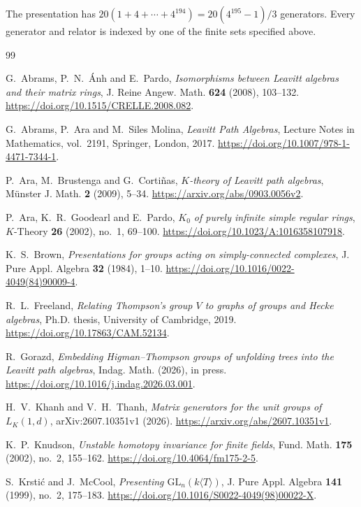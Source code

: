 \documentclass[11pt]{amsart}
\theoremstyle{definition}
\theoremstyle{remark}
\numberwithin{equation}{section}
\begin{document}
The presentation has $20(1+4+\cdots+4^{194})=20(4^{195}-1)/3$ generators. Every generator and relator is indexed by one of the finite sets specified above.

\clearpage
\begin{thebibliography}{99}

G.~Abrams, P.~N.~\'{A}nh and E.~Pardo, \emph{Isomorphisms between Leavitt algebras and their matrix rings}, J. Reine Angew. Math. \textbf{624} (2008), 103--132. \url{https://doi.org/10.1515/CRELLE.2008.082}.

G.~Abrams, P.~Ara and M.~Siles Molina, \emph{Leavitt Path Algebras}, Lecture Notes in Mathematics, vol.~2191, Springer, London, 2017. \url{https://doi.org/10.1007/978-1-4471-7344-1}.

P.~Ara, M.~Brustenga and G.~Corti\~nas, \emph{$K$-theory of Leavitt path algebras}, M\"unster J. Math. \textbf{2} (2009), 5--34. \url{https://arxiv.org/abs/0903.0056v2}.

P.~Ara, K.~R.~Goodearl and E.~Pardo, \emph{$K_0$ of purely infinite simple regular rings}, $K$-Theory \textbf{26} (2002), no.~1, 69--100. \url{https://doi.org/10.1023/A:1016358107918}.

K.~S.~Brown, \emph{Presentations for groups acting on simply-connected complexes}, J. Pure Appl. Algebra \textbf{32} (1984), 1--10. \url{https://doi.org/10.1016/0022-4049(84)90009-4}.

R.~L.~Freeland, \emph{Relating Thompson's group $V$ to graphs of groups and Hecke algebras}, Ph.D. thesis, University of Cambridge, 2019. \url{https://doi.org/10.17863/CAM.52134}.

R.~Gorazd, \emph{Embedding Higman--Thompson groups of unfolding trees into the Leavitt path algebras}, Indag. Math. (2026), in press. \url{https://doi.org/10.1016/j.indag.2026.03.001}.

H.~V.~Khanh and V.~H.~Thanh, \emph{Matrix generators for the unit groups of $L_K(1,d)$}, arXiv:2607.10351v1 (2026). \url{https://arxiv.org/abs/2607.10351v1}.

K.~P.~Knudson, \emph{Unstable homotopy invariance for finite fields}, Fund. Math. \textbf{175} (2002), no.~2, 155--162. \url{https://doi.org/10.4064/fm175-2-5}.

S.~Krsti\'c and J.~McCool, \emph{Presenting $\mathrm{GL}_n(k\langle T\rangle)$}, J. Pure Appl. Algebra \textbf{141} (1999), no.~2, 175--183. \url{https://doi.org/10.1016/S0022-4049(98)00022-X}.


\end{thebibliography}
\end{document}
